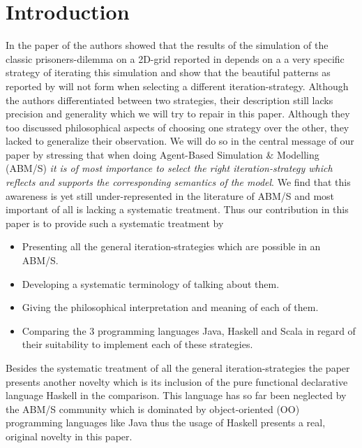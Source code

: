 \section{Introduction}
In the paper of \cite{huberman_evolutionary_1993} the authors showed that the results of the simulation of the classic prisoners-dilemma on a 2D-grid reported in \cite{nowak_evolutionary_1992} depends on a a very specific strategy of iterating this simulation and show that the beautiful patterns as reported by \cite{nowak_evolutionary_1992} will not form when selecting a different iteration-strategy. Although the authors differentiated between two strategies, their description still lacks precision and generality which we will try to repair in this paper. Although they too discussed philosophical aspects of choosing one strategy over the other, they lacked to generalize their observation. We will do so in the central message of our paper by stressing that when doing Agent-Based Simulation \& Modelling (ABM/S) \textit{it is of most importance to select the right iteration-strategy which reflects and supports the corresponding semantics of the model}. We find that this awareness is yet still under-represented in the literature of ABM/S and most important of all is lacking a systematic treatment. Thus our contribution in this paper is to provide such a systematic treatment by
\begin{itemize}
	\item Presenting all the general iteration-strategies which are possible in an ABM/S.
	\item Developing a systematic terminology of talking about them.
	\item Giving the philosophical interpretation and meaning of each of them.
	\item Comparing the 3 programming languages Java, Haskell and Scala in regard of their suitability to implement each of these strategies.
\end{itemize}

Besides the systematic treatment of all the general iteration-strategies the paper presents another novelty which is its inclusion of the pure functional declarative language Haskell in the comparison. This language has so far been neglected by the ABM/S community which is dominated by object-oriented (OO) programming languages like Java thus the usage of Haskell presents a real, original novelty in this paper.